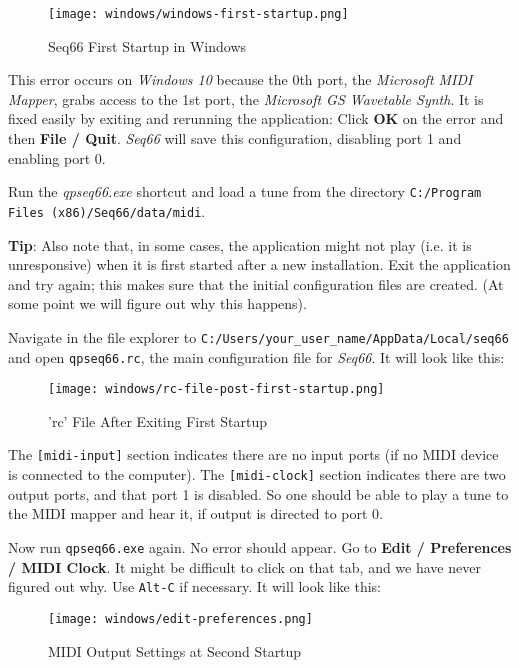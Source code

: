 \begin{figure}[H]
   \centering 
   \texttt{[image: windows/windows-first-startup.png]}
   \caption{Seq66 First Startup in Windows}
   \label{fig:windows_first_startup}
\end{figure}

   This error occurs on \textsl{Windows 10} because the 0th port, the
   \textsl{Microsoft MIDI Mapper}, grabs access to the 1st port, the
   \textsl{Microsoft GS Wavetable Synth}.  It is fixed easily by exiting
   and rerunning the application:
   Click \textbf{OK} on the error and then \textbf{File / Quit}.
   \textsl{Seq66} will save this configuration, disabling port 1 and
   enabling port 0.

   Run the \textsl{qpseq66.exe} shortcut and load a tune from the
   directory \texttt{C:/Program Files (x86)/Seq66/data/midi}.

   \textbf{Tip}:
   Also note that, in some cases, the application might not play (i.e. it is
   unresponsive) when it is first started after a new installation.
   Exit the application and try again; this makes sure that the
   initial configuration files are created.
   (At some point we will figure out why this happens).

   Navigate in the file explorer to
   \texttt{C:/Users/your\_user\_name/AppData/Local/seq66} and open
   \texttt{qpseq66.rc}, the main configuration file for \textsl{Seq66}.
   It will look like this:

\begin{figure}[H]
   \centering 
   \texttt{[image: windows/rc-file-post-first-startup.png]}
   \caption{'rc' File After Exiting First Startup}
   \label{fig:windows_rc_file_post_first_startup}
\end{figure}

   The \texttt{[midi-input]} section indicates there are no input ports
   (if no MIDI device is connected to the computer).
   The \texttt{[midi-clock]} section indicates there are two output
   ports, and that port 1 is disabled.   So one should be able to
   play a tune to the MIDI mapper and hear it, if output is directed
   to port 0.

   Now run \texttt{qpseq66.exe} again.  No error should appear.
   Go to \textbf{Edit / Preferences / MIDI Clock}.  It might be
   difficult to click on that tab, and we have never figured out why.
   Use \texttt{Alt-C} if necessary.
   It will look like this:

\begin{figure}[H]
   \centering 
   \texttt{[image: windows/edit-preferences.png]}
   \caption{MIDI Output Settings at Second Startup}
   \label{fig:windows_output_settings_second_startup}
\end{figure}

